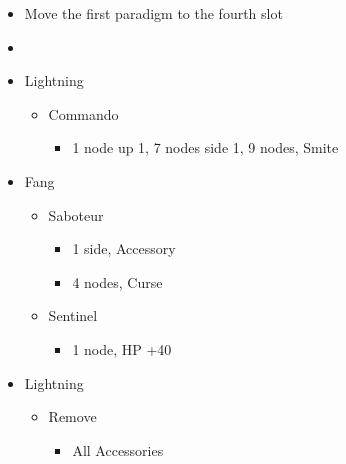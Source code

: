 \begin{menu}
\begin{multicols}{2}
\begin{itemize}
    \paradigm
    \begin{itemize}
        \item Move the first paradigm to the fourth slot
        \item {}%
{\paradigmline{(\rav)}{\syn}{\sab}}%
{\paradigmline{(\rav)}{\rav}{(\sab)}}%
{\paradigmline{(\rav)}{(\rav)}{\sen}}%
{\paradigmline[4]{\textit{\rav}}{\textit{\rav}}{\textit{\com}}}%
{\paradigmline{[\com]}{\rav}{\com}}%
{\paradigmline{[\com]}{\rav}{\com}}
    \end{itemize}
    \crystarium
    \begin{itemize}
        \item Lightning
        \begin{itemize}
            \item Commando
            \begin{itemize}
                \item 1 node up 1, 7 nodes side 1, 9 nodes, Smite
            \end{itemize}
        \end{itemize}
        \item Fang
        \begin{itemize}
            \item Saboteur
            \begin{itemize}
                \item 1 side, Accessory
                \item 4 nodes, Curse
            \end{itemize}
            \item Sentinel
            \begin{itemize}
                \item 1 node, HP +40
            \end{itemize}
        \end{itemize}
    \end{itemize}
    \columnbreak
    \equip
    \begin{itemize}
        \item Lightning
        \begin{itemize}
            \item Remove
            \begin{itemize}
                \item All Accessories

\end{itemize}
\end{itemize}
\end{itemize}
\end{itemize}
\end{multicols}
\end{menu}
